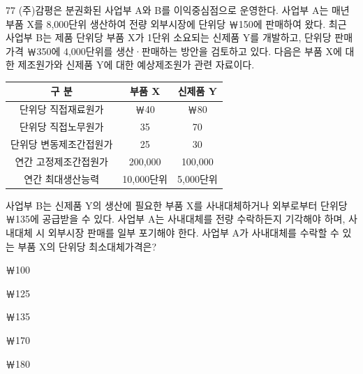 \begin{question}{77}
(주)감평은 분권화된 사업부 A와 B를 이익중심점으로 운영한다. 사업부 A는 매년 부품 X를 8,000단위 생산하여 전량 외부시장에 단위당 ￦150에 판매하여 왔다. 최근 사업부 B는 제품 단위당 부품 X가 1단위 소요되는 신제품 Y를 개발하고, 단위당 판매가격 ￦350에 4,000단위를 생산·판매하는 방안을 검토하고 있다. 다음은 부품 X에 대한 제조원가와 신제품 Y에 대한 예상제조원가 관련 자료이다.
\par{\small\centering\begin{tabular}{|c|c|c|}\hline
구 분 & 부품 X & 신제품 Y \\ \hline
단위당 직접재료원가 & ￦40 & ￦80 \\ \hline
단위당 직접노무원가 & 35 & 70 \\ \hline
단위당 변동제조간접원가 & 25 & 30 \\ \hline
연간 고정제조간접원가 & 200,000 & 100,000 \\ \hline
연간 최대생산능력 & 10,000단위 & 5,000단위 \\ \hline
\end{tabular}\par}
사업부 B는 신제품 Y의 생산에 필요한 부품 X를 사내대체하거나 외부로부터 단위당 ￦135에 공급받을 수 있다. 사업부 A는 사내대체를 전량 수락하든지 기각해야 하며, 사내대체 시 외부시장 판매를 일부 포기해야 한다. 사업부 A가 사내대체를 수락할 수 있는 부품 X의 단위당 최소대체가격은?
\begin{choices}
  \item ￦100
  \item ￦125
  \item ￦135
  \item ￦170
  \item ￦180
\end{choices}
\end{question}
